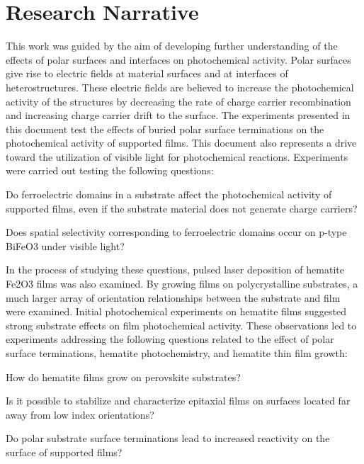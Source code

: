 \documentclass[12pt,%
              twoside,
               letterpaper]{uiothesis}
\begin{document}
\section{Research Narrative}
\label{sec:intro.objectives}


This work was guided by the aim of developing further understanding of the effects of
polar surfaces and interfaces on photochemical activity. Polar surfaces give rise to
electric fields at material surfaces and at interfaces of heterostructures. These electric
fields are believed to increase the photochemical activity of the structures by decreasing
the rate of charge carrier recombination and increasing charge carrier drift to the
surface. The experiments presented in this document test the effects of buried polar
surface terminations on the photochemical activity of supported films. This document also
represents a drive toward the utilization of visible light for photochemical reactions.
Experiments were carried out testing the following questions:

\begin{items}

	\item Do ferroelectric domains in a substrate affect the photochemical activity of
supported films, even if the substrate material does not generate charge carriers?
	\item Does spatial selectivity corresponding to ferroelectric domains occur on p-type
BiFeO3 under visible light?
\end{items}

In the process of studying these questions, pulsed laser deposition of hematite Fe2O3
films was also examined. By growing films on polycrystalline substrates, a much larger
array of orientation relationships between the substrate and film were examined. Initial
photochemical experiments on hematite films suggested strong substrate effects on film
photochemical activity. These observations led to experiments addressing the following
questions related to the effect of polar surface terminations, hematite photochemistry,
and hematite thin film growth:

\begin{items}
	\item How do hematite films grow on perovskite substrates?
	\item Is it possible to stabilize and characterize epitaxial films on surfaces located
far away from low index orientations?
	\item Do polar substrate surface terminations lead to increased reactivity on the
surface of supported films?
\end{items}
\end{document}

